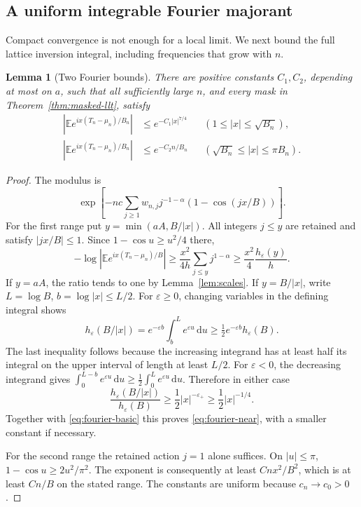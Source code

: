 \documentclass[11pt,a4paper]{article}
\numberwithin{equation}{section}
\newtheorem{lemma}[theorem]{Lemma}
\theoremstyle{definition}
\theoremstyle{remark}
\newcommand{\E}{\mathbb E}
\newcommand{\eps}{\varepsilon}
\newcommand{\dd}{\,\mathrm d}
\begin{document}
\subsection{A uniform integrable Fourier majorant}
Compact convergence is not enough for a local limit. We next bound the full
lattice inversion integral, including frequencies that grow with \(n\).

\begin{lemma}[Two Fourier bounds]
\label{lem:fourier}
There are positive constants \(C_1,C_2\), depending at most on \(a\), such
that all sufficiently large \(n\), and every mask in
Theorem~\ref{thm:masked-llt}, satisfy
\begin{align}
 \left|\E e^{ix(T_n-\mu_n)/B_n}\right|
 &\le e^{-C_1|x|^{7/4}}
 &&(1\le|x|\le\sqrt{B_n}), \label{eq:fourier-near}\\
 \left|\E e^{ix(T_n-\mu_n)/B_n}\right|
 &\le e^{-C_2n/B_n}
 &&(\sqrt{B_n}\le|x|\le\pi B_n).
 \label{eq:fourier-far}
\end{align}
\end{lemma}
\begin{proof}
The modulus is
\[
 \exp\left[-nc\sum_{j\ge1}w_{n,j}j^{-1-\alpha}
                   (1-\cos(jx/B))\right].
\]
For the first range put \(y=\min(aA,B/|x|)\). All integers \(j\le y\)
are retained and satisfy \(|jx/B|\le1\). Since
\(1-\cos u\ge u^2/4\) there,
\begin{equation}
 -\log\left|\E e^{ix(T_n-\mu_n)/B}\right|
 \ge\frac{x^2}{4h}\sum_{j\le y}j^{1-\alpha}
 \ge\frac{x^2}{4}\frac{h_\eps(y)}h.
 \label{eq:fourier-basic}
\end{equation}
If \(y=aA\), the ratio tends to one by Lemma~\ref{lem:scales}. If
\(y=B/|x|\), write \(L=\log B\), \(b=\log|x|\le L/2\).
For \(\eps\ge0\), changing variables in the defining integral shows
\[
 h_\eps(B/|x|)
 =e^{-\eps b}\int_b^L e^{\eps u}\dd u
 \ge\tfrac12 e^{-\eps b}h_\eps(B).
\]
The last inequality follows because the increasing integrand has at least
half its integral on the upper interval of length at least \(L/2\).
For \(\eps<0\), the decreasing integrand gives
\(\int_0^{L-b}e^{\eps u}\dd u\ge\tfrac12\int_0^Le^{\eps u}\dd u\).
Therefore in either case
\[
 \frac{h_\eps(B/|x|)}{h_\eps(B)}
 \ge\frac12|x|^{-\eps_+}\ge\frac12|x|^{-1/4}.
\]
Together with \eqref{eq:fourier-basic} this proves
\eqref{eq:fourier-near}, with a smaller constant if necessary.

For the second range the retained action \(j=1\) alone suffices. On
\(|u|\le\pi\), \(1-\cos u\ge2u^2/\pi^2\). The exponent is consequently
at least \(C n x^2/B^2\), which is at least \(C n/B\) on the stated range.
The constants are uniform because \(c_n\to c_0>0\).
\end{proof}
\end{document}
